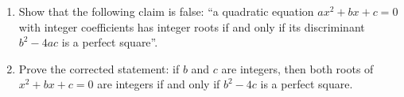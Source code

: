 \begin{enumerate}
\item[(a)] Show that the following claim is false: ``a quadratic equation $ax^2+bx+c=0$ with integer coefficients has integer roots if and only if its discriminant $b^2-4ac$ is a perfect square''.
\item[(b)] Prove the corrected statement: if $b$ and $c$ are integers, then both roots of $x^2+bx+c=0$ are integers if and only if $b^2-4c$ is a perfect square.
\end{enumerate}
